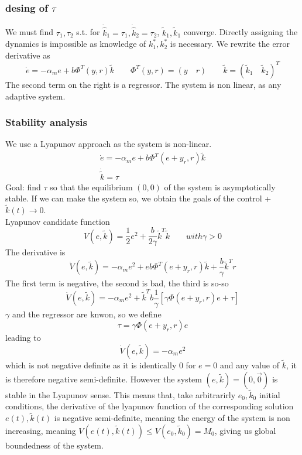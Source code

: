 \documentclass{book}
\begin{document}
\subsubsection{desing of $\tau$}
We must find $\tau_1,\tau_2$ s.t. for $\dot{\hat{k}}_1=\tau_1,\dot{\hat{k}}_2=\tau_2$, $\tilde{k}_1,\tilde{k}_1$ converge. Directly assigning the dynamics is impossible as knowledge of $k_1^*,k_2^*$ is necessary. We rewrite the error derivative as 
\[
    \dot{e}=-\alpha_me+b\Phi^T(y,r)\tilde{k} \qquad \Phi^T(y,r)=(y\quad r) \qquad \tilde{k}=(\tilde{k}_1 \quad \tilde{k}_2)^T
\]
The second term on the right is a regressor. The system is non linear, as any adaptive system. 

\subsubsection{Stability analysis}
We use a Lyapunov approach as the system is non-linear. 
\begin{gather*}
    \dot{e}=-\alpha_me+b\Phi^T(e+y_r,r)\tilde{k} \\
    \dot{\tilde{k}}=\tau
\end{gather*}
Goal: find $\tau$ so that the equilibrium $(0,0)$ of the system is asymptotically stable. If we can make the system so, we obtain the goals of the control + $\tilde{k}(t)\to 0$. 
\\Lyapunov candidate function
\[
    V(e,\tilde{k})=\displaystyle\frac{1}{2}e^2+\displaystyle\frac{b}{2\gamma}\tilde{k}^T\tilde{k} \qquad with \gamma>0
\]
The derivative is 
\[
    \dot{V}(e,\tilde{k})=-\alpha_me^2+eb\Phi^T(e+y_r,r)\tilde{k} + \displaystyle\frac{b}{\gamma}\tilde{k}^Tr
\]
The first term is negative, the second is bad, the third is so-so
\[
    \dot{V}(e,\tilde{k})=-\alpha_me^2+\tilde{k}^Tb\displaystyle\frac{1}{\gamma}[\gamma\Phi(e+y_r,r)e+\tau]
\]
$\gamma$ and the regressor are knwon, so we define 
\[
    \tau=\gamma\Phi(e+y_r,r)e
\]
leading to 
\[
    \dot{V}(e,\tilde{k})=-\alpha_me^2
\]
which is not negative definite as it is identically 0 for $e=0$ and any value of $\tilde{k}$, it is therefore negative semi-definite. However the system $(e,\tilde{k})=(0,\vec{0})$ is stable in the Lyapunov sense.
This means that, take arbitrarirly $e_0,\tilde{k}_0$ initial conditions, the derivative of the lyapunov function of the corresponding solution $e(t),\tilde{k}(t)$ is negative semi-definite, meaning the energy of the system is non increasing, meaning $V(e(t),\tilde{k}(t))\leq V(e_0,\tilde{k}_0)=M_0$, giving us global boundedness of the system. 
\end{document}
